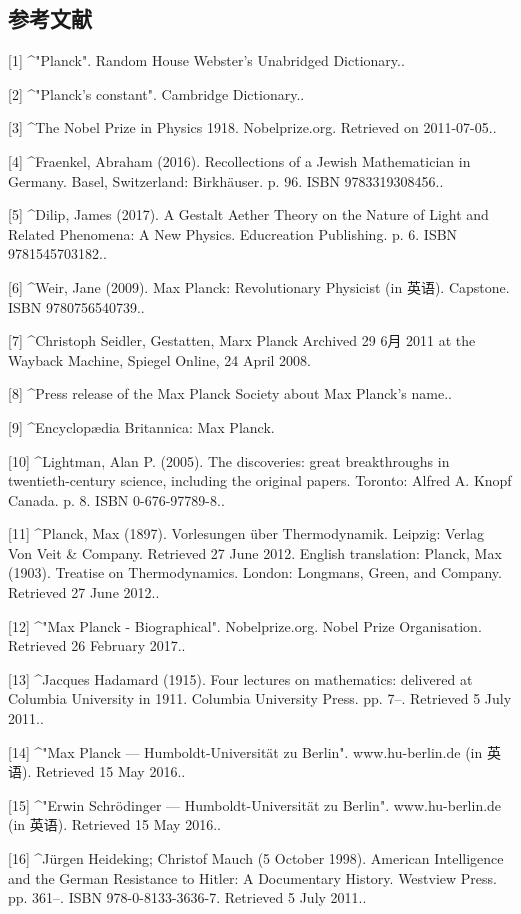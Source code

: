 \subsection{参考文献}
[1]
^"Planck". Random House Webster's Unabridged Dictionary..

[2]
^"Planck's constant". Cambridge Dictionary..

[3]
^The Nobel Prize in Physics 1918. Nobelprize.org. Retrieved on 2011-07-05..

[4]
^Fraenkel, Abraham (2016). Recollections of a Jewish Mathematician in Germany. Basel, Switzerland: Birkhäuser. p. 96. ISBN 9783319308456..

[5]
^Dilip, James (2017). A Gestalt Aether Theory on the Nature of Light and Related Phenomena: A New Physics. Educreation Publishing. p. 6. ISBN 9781545703182..

[6]
^Weir, Jane (2009). Max Planck: Revolutionary Physicist (in 英语). Capstone. ISBN 9780756540739..

[7]
^Christoph Seidler, Gestatten, Marx Planck Archived 29 6月 2011 at the Wayback Machine, Spiegel Online, 24 April 2008.

[8]
^Press release of the Max Planck Society about Max Planck's name..

[9]
^Encyclopædia Britannica: Max Planck.

[10]
^Lightman, Alan P. (2005). The discoveries: great breakthroughs in twentieth-century science, including the original papers. Toronto: Alfred A. Knopf Canada. p. 8. ISBN 0-676-97789-8..

[11]
^Planck, Max (1897). Vorlesungen über Thermodynamik. Leipzig: Verlag Von Veit & Company. Retrieved 27 June 2012. English translation: Planck, Max (1903). Treatise on Thermodynamics. London: Longmans, Green, and Company. Retrieved 27 June 2012..

[12]
^"Max Planck - Biographical". Nobelprize.org. Nobel Prize Organisation. Retrieved 26 February 2017..

[13]
^Jacques Hadamard (1915). Four lectures on mathematics: delivered at Columbia University in 1911. Columbia University Press. pp. 7–. Retrieved 5 July 2011..

[14]
^"Max Planck — Humboldt-Universität zu Berlin". www.hu-berlin.de (in 英语). Retrieved 15 May 2016..

[15]
^"Erwin Schrödinger — Humboldt-Universität zu Berlin". www.hu-berlin.de (in 英语). Retrieved 15 May 2016..

[16]
^Jürgen Heideking; Christof Mauch (5 October 1998). American Intelligence and the German Resistance to Hitler: A Documentary History. Westview Press. pp. 361–. ISBN 978-0-8133-3636-7. Retrieved 5 July 2011..

